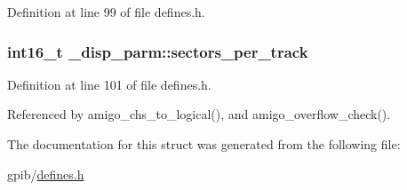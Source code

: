 Definition at line 99 of file defines.\+h.

\subsubsection[{\texorpdfstring{sectors\+\_\+per\+\_\+track}{sectors_per_track}}]{\setlength{\rightskip}{0pt plus 5cm}int16\+\_\+t \+\_\+disp\+\_\+parm\+::sectors\+\_\+per\+\_\+track}\hypertarget{struct__disp__parm_a870887d0582245d0c35f34724180463c}{}\label{struct__disp__parm_a870887d0582245d0c35f34724180463c}


Definition at line 101 of file defines.\+h.



Referenced by amigo\+\_\+chs\+\_\+to\+\_\+logical(), and amigo\+\_\+overflow\+\_\+check().



The documentation for this struct was generated from the following file\+:\begin{DoxyCompactItemize}
\item 
gpib/\hyperlink{defines_8h}{defines.\+h}\end{DoxyCompactItemize}
